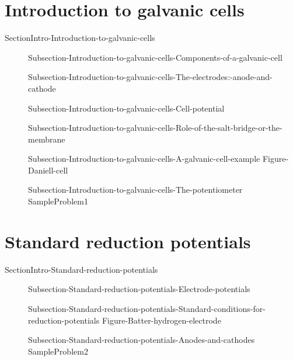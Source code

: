 \documentclass[main.tex]{subfiles}
\begin{document}
\section{Introduction to galvanic cells}{SectionIntro-Introduction-to-galvanic-cells}
\sloppy\begin{description}
\item[] 	{Subsection-Introduction-to-galvanic-cells-Components-of-a-galvanic-cell}
\item[]{Subsection-Introduction-to-galvanic-cells-The-electrodes:-anode-and-cathode}
\item[]{Subsection-Introduction-to-galvanic-cells-Cell-potential}
\item[]{Subsection-Introduction-to-galvanic-cells-Role-of-the-salt-bridge-or-the-membrane}
\item[]{Subsection-Introduction-to-galvanic-cells-A-galvanic-cell-example}
{Figure-Daniell-cell}
\item[] {Subsection-Introduction-to-galvanic-cells-The-potentiometer}
{SampleProblem1}
\end{description}

\section{Standard reduction potentials}{SectionIntro-Standard-reduction-potentials} 
\sloppy\begin{description}
\item[]{Subsection-Standard-reduction-potentials-Electrode-potentials}
\item[]{Subsection-Standard-reduction-potentials-Standard-conditions-for-reduction-potentials}
{Figure-Batter-hydrogen-electrode}
\item[]{Subsection-Standard-reduction-potentials-Anodes-and-cathodes}
{SampleProblem2}
\end{description}
\end{document}
